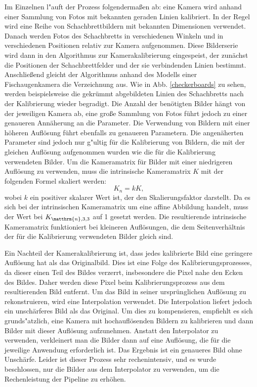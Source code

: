 \documentclass[arbeit=studie,oneside,BCOR=12mm]{ArbeitRST}
\begin{document}
Im Einzelnen l"auft der Prozess folgenderma{\ss}en ab: eine Kamera wird anhand
einer Sammlung von Fotos mit bekannten geraden Linien kalibriert. In der Regel
wird eine Reihe von Schachbrettbildern mit bekannten Dimensionen verwendet.
\cite{addison} Danach werden Fotos des Schachbretts in verschiedenen Winkeln
und in verschiedenen Positionen relativ zur Kamera aufgenommen. Diese
Bilderserie wird dann in den Algorithmus zur Kamerakalibrierung eingespeist,
der zunächst die Positionen der Schachbrettfelder und der sie verbindenden
Linien bestimmt. Anschließend gleicht der Algorithmus anhand des Modells einer
Fischaugenkamera die Verzeichnung aus. Wie in Abb. \ref{checkerboards} zu
sehen, werden beispielsweise die gekrümmt abgebildeten Linien des Schachbretts nach der
Kalibrierung wieder begradigt. Die Anzahl der benötigten Bilder hängt von
der jeweiligen Kamera ab, eine große Sammlung von Fotos führt jedoch zu einer
genaueren Annäherung an die Parameter.  Die Verwendung von Bildern mit einer
höheren Auflösung führt ebenfalls zu genaueren Parametern. \cite{addison} Die
angenäherten Parameter sind jedoch nur g"ultig für die Kalibrierung von Bildern,
die mit der gleichen Auflösung aufgenommen wurden wie die für die
Kalibrierung verwendeten Bilder. Um die Kameramatrix für Bilder mit einer
niedrigeren Auflösung zu verwenden, muss die intrinsische Kameramatrix $K$ mit
der folgenden Formel skaliert werden: 
\begin{equation} 
    K_n = k K, 
\end{equation} 
wobei $k$ ein positiver skalarer Wert ist, der den Skalierungsfaktor darstellt. Da es
sich bei der intrinsischen Kameramatrix um eine affine Abbildung handelt, muss
der Wert bei $K_{\matthrm{n},3, 3}$ auf 1 gesetzt werden. Die resultierende intrinsische
Kameramatrix funktioniert bei kleineren Auflösungen, die dem Seitenverhältnis
der für die Kalibrierung verwendeten Bilder gleich sind. 

Ein Nachteil der Kamerakalibrierung ist, dass jedes kalibrierte Bild eine
geringere Auflösung hat als das Originalbild. Dies ist eine Folge des
Kalibrierungsprozesses, da dieser einen Teil des Bildes verzerrt,
insbesondere die Pixel nahe den Ecken des Bildes. Daher werden diese Pixel beim
Kalibrierungsprozess aus dem resultierenden Bild entfernt. Um das Bild in
seiner ursprünglichen Auflösung zu rekonstruieren, wird eine Interpolation
verwendet. Die Interpolation liefert jedoch ein unschärferes Bild als das
Original. Um dies zu kompensieren, empfiehlt es sich grunds"atzlich, eine Kamera mit
hochauflösenden Bildern zu kalibrieren und dann Bilder mit dieser Auflösung
aufzunehmen. Anstatt den Interpolator zu verwenden, verkleinert man die Bilder
dann auf eine Auflösung, die für die jeweilige Anwendung erforderlich ist.  Das
Ergebnis ist ein genaueres Bild ohne Unschärfe. Leider ist dieser Prozess sehr
rechenintensiv, und es wurde beschlossen, nur die Bilder aus dem Interpolator
zu verwenden, um die Rechenleistung der Pipeline zu erhöhen.
\end{document}
